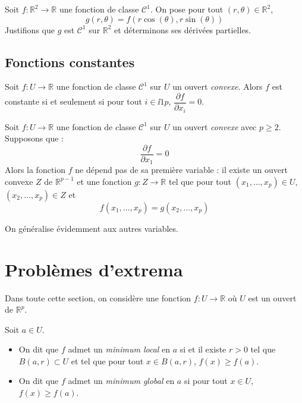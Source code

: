 \documentclass[french,11pt,twoside]{VcCours}
\begin{document}
\medskip

Soit $f : \mathbb{R}^2 \rightarrow \mathbb{R}$ une fonction de classe $\mathcal{C}^1$. On pose pour tout $(r, \theta) \in \mathbb{R}^2$,
$$ g(r, \theta)= f(r \cos(\theta), r \sin(\theta))$$
Justifions que $g$ est $\mathcal{C}^1$ sur $\mathbb{R}^2$ et déterminons ses dérivées partielles.


\newpage

\vspace*{3cm}

\subsection{Fonctions constantes}

\begin{Proposition}{} Soit $f : U \rightarrow \mathbb{R}$ une fonction de classe $\mathcal{C}^1$ sur $U$ un ouvert \emph{convexe}. Alors $f$ est constante si et seulement si pour tout $i \in \ii{1}{p}$, $\dfrac{\partial f}{\partial x_i}=0$.
\end{Proposition}

\begin{Proposition}{} Soit $f : U \rightarrow \mathbb{R}$ une fonction de classe $\mathcal{C}^1$ sur $U$ un ouvert \emph{convexe} avec $p \geq 2$. Supposons que :
$$ \dfrac{\partial f }{\partial x_1} = 0$$
Alors la fonction $f$ ne \og dépend pas \fg{} de sa première variable : il existe un ouvert convexe $Z$ de $\mathbb{R}^{p-1}$ et une fonction $g : Z \rightarrow \mathbb{R}$ tel que pour tout $(x_1, \ldots, x_p) \in U$, $(x_2, \ldots,x_p) \in Z$ et 
$$f(x_1, \ldots, x_p) = g(x_2, \ldots, x_p) $$
\end{Proposition}

\begin{Remarque}{} On généralise évidemment aux autres variables.
\end{Remarque}

\section{Problèmes d'extrema}
Dans toute cette section, on considère une fonction $f : U \rightarrow \mathbb{R}$ où $U$ est un ouvert de $\mathbb{R}^p$.

\begin{Definition}{} Soit $a \in U$.
\begin{itemize}
\item On dit que $f$ admet un \emph{minimum local} en $a$ si et il existe $r >0$ tel que $B(a,r) \subset U$ et tel que pour tout $x \in B(a,r)$, $f(x) \geq f(a)$.
\item On dit que $f$ admet un \emph{minimum global} en $a$ si pour tout $x \in U$, $f(x) \geq f(a)$.
\end{itemize}
\end{Definition}
\end{document}
